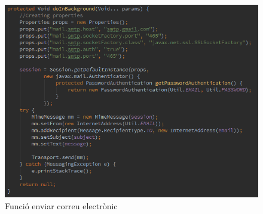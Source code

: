 \begin{itemize}
\begin{figure}[!h]
\centering
\includegraphics[scale=0.8]{Figures/email2.png}
\caption{Funció enviar correu electrònic}
\end{figure}

\end{itemize}